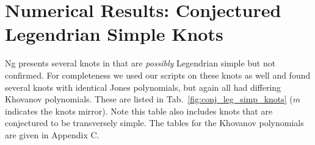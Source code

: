 \documentclass{article}
\theoremstyle{plain}
\begin{document}
    \section{Numerical Results: Conjectured Legendrian Simple Knots}
        Ng presents several knots in \cite{LegendrianKnotAtlas} that are
        \textit{possibly} Legendrian simple but not confirmed. For completeness
        we used our scripts on these knots as well and found several knots with
        identical Jones polynomials, but again all had differing Khovanov
        polynomials. These are listed in
        Tab.~\ref{fig:conj_leg_simp_knots} ($m$ indicates the knots mirror).
        Note this table also includes knots that are conjectured to be
        transversely simple.
        The tables for the Khovanov polynomials are given in Appendix C.
        \begin{table}
            \centering
\end{table}
\end{document}
